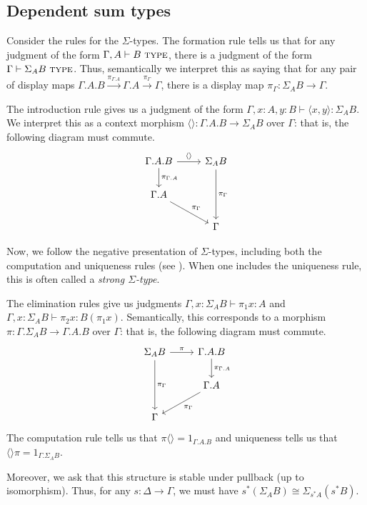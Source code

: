 \documentclass{article}
\theoremstyle{definition}
\newcommand{\type}{\ \textsc{type}}
\begin{document}
\subsection{Dependent sum types}

Consider the rules for the $\Sigma$-types. The formation rule tells us that for any judgment of the form $\Gamma, A \vdash B \type$, there is a judgment of the form $\Gamma \vdash \Sigma_A B \type$. Thus, semantically we interpret this as saying that for any pair of display maps $\Gamma.A . B \xrightarrow{\pi_{\Gamma.A}} \Gamma. A  \xrightarrow{\pi_{\Gamma}} \Gamma$, there is a display map $\pi_\Gamma : \Sigma_A B \to \Gamma$.

The introduction rule gives us a judgment of the form $\Gamma , x : A , y : B \vdash \langle x , y \rangle : \Sigma_A B$. We interpret this as a context morphism $\langle \rangle : \Gamma. A . B \to \Sigma_A B$ over $\Gamma$: that is, the following diagram must commute.
\[
     \begin{tikzcd}
         \Gamma . A . B \ar[d, "\pi_{\Gamma.A}"] \ar[r,"\langle \rangle"] & \Sigma_A B \ar[dd,"\pi_\Gamma"] \\
         \Gamma . A \ar[dr, "\pi_{\Gamma}"] \\
         & \Gamma
     \end{tikzcd}
\] 

Now, we follow the negative presentation of $\Sigma$-types, including both the computation and uniqueness rules (see \cite{nlab-sums}). When one includes the uniqueness rule, this is often called a \emph{strong $\Sigma$-type}.

The elimination rules give us judgments $\Gamma, x: \Sigma_A B \vdash \pi_1 x : A$ and $\Gamma, x: \Sigma_A B \vdash \pi_2 x : B(\pi_1 x)$. Semantically, this corresponds to a morphism $\pi : \Gamma. \Sigma_A B \to \Gamma . A . B$ over $\Gamma$: that is, the following diagram must commute.
\[
     \begin{tikzcd}
          \Sigma_A B \ar[r,"\pi"]  \ar[dd,"\pi_\Gamma"] &  \Gamma . A . B \ar[d, "\pi_{\Gamma.A}"] \\
         & \Gamma . A \ar[dl, "\pi_{\Gamma}"] \\
         \Gamma
     \end{tikzcd}
\] 
The computation rule tells us that $\pi \langle \rangle = 1_{\Gamma . A . B}$ and uniqueness tells us that $ \langle \rangle \pi = 1_{\Gamma . \Sigma_A B}$.

Moreover, we ask that this structure is stable under pullback (up to isomorphism). Thus, for any $s: \Delta \to \Gamma$, we must have $ s^* (\Sigma_A B ) \cong \Sigma_{s^* A} (s ^* B)$.
\end{document}
